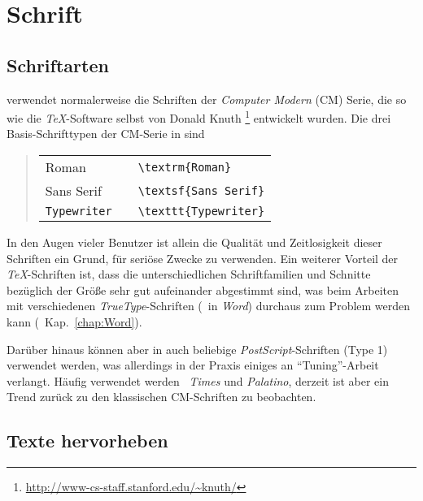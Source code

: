 \section{Schrift}

\subsection{Schriftarten}

\latex verwendet normalerweise die Schriften der \emph{Computer
Modern}
(CM) Serie, die so wie die \emph{TeX}-Software selbst von Donald Knuth%
\footnote{\url{http://www-cs-staff.stanford.edu/~knuth/}} entwickelt
wurden. Die drei Basis-Schrifttypen der CM-Serie in \latex sind
%
\begin{quote}
\begin{tabular}{lcl}
\textrm{Roman}      & & \verb!\textrm{Roman}!\\
\textsf{Sans Serif} & & \verb!\textsf{Sans Serif}!\\
\texttt{Typewriter} & & \verb!\texttt{Typewriter}!\\
\end{tabular}
\end{quote}
%
\noindent In den Augen vieler Benutzer ist allein die Qualität und
Zeitlosigkeit dieser Schriften ein Grund, \latex für seriöse
Zwecke zu verwenden. Ein weiterer Vorteil der \emph{TeX}-Schriften
ist, dass die unterschiedlichen Schriftfamilien und Schnitte
bezüglich der Größe sehr gut aufeinander abgestimmt sind, was %
beim Arbeiten mit verschiedenen \emph{TrueType}-Schriften (\zB\ in
\emph{Word}) durchaus zum Problem werden kann (\sa\ Kap.\
\ref{chap:Word}).

Darüber hinaus können aber in \latex auch beliebige 
\emph{PostScript}-Schrif\-ten (Type 1) verwendet werden, was allerdings in
der Praxis einiges an "`Tuning"'-Arbeit verlangt. Häufig verwendet
werden \zB\ \emph{Times} und \emph{Palatino}, derzeit ist aber ein Trend 
zurück zu den klassischen CM-Schriften zu beobachten.



\subsection{Texte hervorheben}

